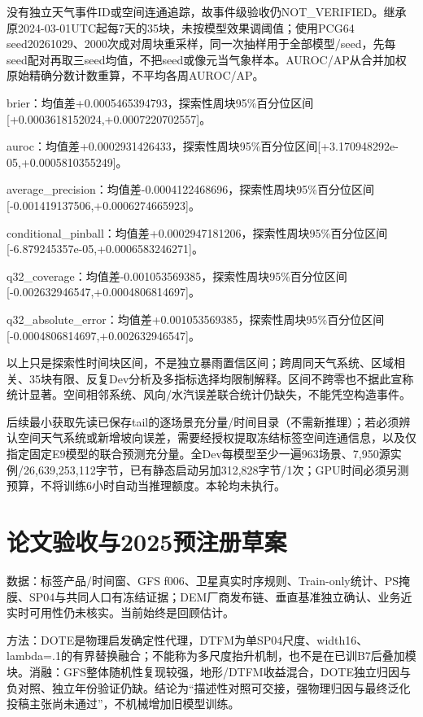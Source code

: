 \documentclass[UTF8,a4paper,10pt,fontset=none]{ctexart}
\begin{document}
没有独立天气事件ID或空间连通追踪，故事件级验收仍NOT\_VERIFIED。继承原2024-03-01UTC起每7天的35块，未按模型效果调阈值；使用PCG64 seed20261029、2000次成对周块重采样，同一次抽样用于全部模型/seed，先每seed配对再取三seed均值，不把seed或像元当气象样本。AUROC/AP从合并加权原始精确分数计数重算，不平均各周AUROC/AP。

brier：均值差+0.0005465394793，探索性周块95\%百分位区间[+0.0003618152024,\allowbreak{}+0.0007220702557]。

auroc：均值差+0.0002931426433，探索性周块95\%百分位区间[+3.170948292e-05,\allowbreak{}+0.0005810355249]。

average\_precision：均值差-0.0004122468696，探索性周块95\%百分位区间[-0.001419137506,\allowbreak{}+0.0006274665923]。

conditional\_pinball：均值差+0.0002947181206，探索性周块95\%百分位区间[-6.879245357e-05,\allowbreak{}+0.0006583246271]。

q32\_coverage：均值差-0.001053569385，探索性周块95\%百分位区间[-0.002632946547,\allowbreak{}+0.0004806814697]。

q32\_absolute\_error：均值差+0.001053569385，探索性周块95\%百分位区间[-0.0004806814697,\allowbreak{}+0.002632946547]。

以上只是探索性时间块区间，不是独立暴雨置信区间；跨周同天气系统、区域相关、35块有限、反复Dev分析及多指标选择均限制解释。区间不跨零也不据此宣称统计显著。空间相邻系统、风向/水汽误差联合统计仍缺失，不能凭空构造事件。

后续最小获取先读已保存tail的逐场景充分量/时间目录（不需新推理）；若必须辨认空间天气系统或新增坡向误差，需要经授权提取冻结标签空间连通信息，以及仅指定固定E9模型的联合预测充分量。全Dev每模型至少一遍963场景、7,\allowbreak{}950源实例/26,\allowbreak{}639,\allowbreak{}253,\allowbreak{}112字节，已有静态启动另加312,\allowbreak{}828字节/1次；GPU时间必须另测预算，不将训练6小时自动当推理额度。本轮均未执行。
\section{论文验收与2025预注册草案}
数据：标签产品/时间窗、GFS f006、卫星真实时序规则、Train-only统计、PS掩膜、SP04与共同人口有冻结证据；DEM厂商发布链、垂直基准独立确认、业务近实时可用性仍未核实。当前始终是回顾估计。

方法：DOTE是物理启发确定性代理，DTFM为单SP04尺度、width16、lambda=.1的有界替换融合；不能称为多尺度抬升机制，也不是在已训B7后叠加模块。消融：GFS整体随机性复现较强，地形/DTFM收益混合，DOTE独立归因与负对照、独立年份验证仍缺。结论为“描述性对照可交接，强物理归因与最终泛化投稿主张尚未通过”，不机械增加旧模型训练。
\end{document}
